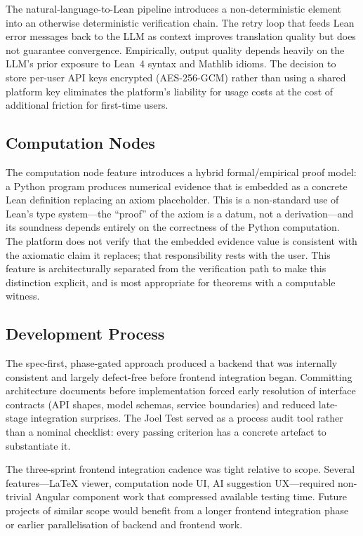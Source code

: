 \documentclass[conference]{IEEEtran}
\begin{document}
The natural-language-to-Lean pipeline introduces a non-deterministic element
into an otherwise deterministic verification chain. The retry loop that feeds
Lean error messages back to the LLM as context improves translation quality
but does not guarantee convergence. Empirically, output quality depends
heavily on the LLM's prior exposure to Lean~4 syntax and Mathlib idioms.
The decision to store per-user API keys encrypted (AES-256-GCM) rather than
using a shared platform key eliminates the platform's liability for usage
costs at the cost of additional friction for first-time users.

\subsection{Computation Nodes}
\label{subsec:disc-compute}

The computation node feature introduces a hybrid formal/empirical proof
model: a Python program produces numerical evidence that is embedded as a
concrete Lean definition replacing an axiom placeholder. This is a
non-standard use of Lean's type system---the ``proof'' of the axiom is a
datum, not a derivation---and its soundness depends entirely on the
correctness of the Python computation. The platform does not verify that the
embedded evidence value is consistent with the axiomatic claim it replaces;
that responsibility rests with the user. This feature is architecturally
separated from the verification path to make this distinction explicit, and
is most appropriate for theorems with a computable witness.

\subsection{Development Process}
\label{subsec:disc-process}

The spec-first, phase-gated approach produced a backend that was internally
consistent and largely defect-free before frontend integration began.
Committing architecture documents before implementation forced early
resolution of interface contracts (API shapes, model schemas, service
boundaries) and reduced late-stage integration surprises. The Joel Test
served as a process audit tool rather than a nominal checklist: every
passing criterion has a concrete artefact to substantiate it.

The three-sprint frontend integration cadence was tight relative to scope.
Several features---\LaTeX{} viewer, computation node UI, AI suggestion
UX---required non-trivial Angular component work that compressed available
testing time. Future projects of similar scope would benefit from a longer
frontend integration phase or earlier parallelisation of backend and
frontend work.
\end{document}
